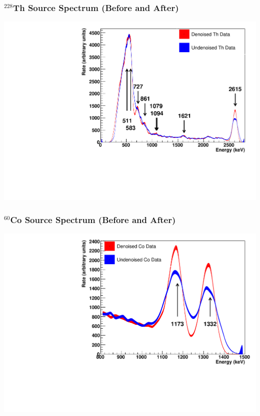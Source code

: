 \documentclass{beamer}
\begin{document}
\begin{frame}
\begin{center}
\frametitle{$^{228}$Th Source Spectrum (Before and After)}
\end{center}
\vspace{1cm}
\begin{center}
\includegraphics[keepaspectratio=true,width=\textwidth]{ThSourceSpectrumComparison.pdf}
\end{center}
\end{frame}

\begin{frame}
\begin{center}
\frametitle{$^{60}$Co Source Spectrum (Before and After)}
\end{center}
\vspace{1cm}
\begin{center}
\includegraphics[keepaspectratio=true,width=\textwidth]{CoSourceSpectrumComparison.pdf}
\end{center}
\end{frame}
\end{document}
